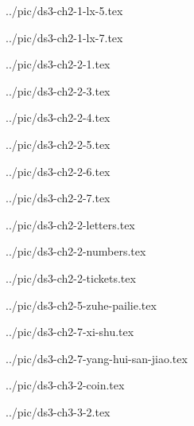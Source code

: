

../pic/ds3-ch2-1-lx-5.tex



../pic/ds3-ch2-1-lx-7.tex



../pic/ds3-ch2-2-1.tex



../pic/ds3-ch2-2-3.tex



../pic/ds3-ch2-2-4.tex



../pic/ds3-ch2-2-5.tex



../pic/ds3-ch2-2-6.tex



../pic/ds3-ch2-2-7.tex



../pic/ds3-ch2-2-letters.tex



../pic/ds3-ch2-2-numbers.tex



../pic/ds3-ch2-2-tickets.tex



../pic/ds3-ch2-5-zuhe-pailie.tex



../pic/ds3-ch2-7-xi-shu.tex



../pic/ds3-ch2-7-yang-hui-san-jiao.tex



../pic/ds3-ch3-2-coin.tex



../pic/ds3-ch3-3-2.tex

